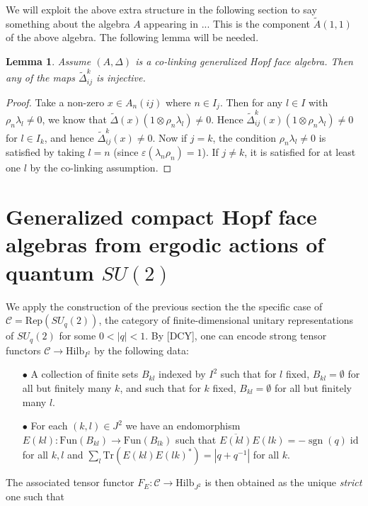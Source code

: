 \documentclass[12pt]{article}
\theoremstyle{change}
\DeclareMathOperator{\id}{id}
\DeclareMathOperator{\sgn}{\mathrm{sgn}}
\newcommand{\Tr}{\mathrm{Tr}}
\newcommand{\CatC}{\mathcal{C}}
\newcommand{\Hilb}{\mathrm{Hilb}}
\newcommand{\Fun}{\mathrm{Fun}}
\newcommand{\wDelta}{\widetilde{\Delta}}
\newcommand{\Rep}{\mathrm{Rep}}
\newtheorem{Lem}[Theorem]{Lemma}
\theoremstyle{definition}
\numberwithin{equation}{section}
\begin{document}
We will exploit the above extra structure in the following section to say something about the algebra $A$ appearing in ... This is the component $\tilde{A}(1,1)$ of the above algebra. The following lemma will be needed.

\begin{Lem} Assume $(A,\Delta)$ is a co-linking generalized Hopf face algebra. Then any of the maps $\wDelta_{ij}^k$ is injective.\end{Lem}

\begin{proof} Take a non-zero $x\in A_n(ij)$ where $n\in I_j$. Then for any $l\in I$ with $\rho_n\lambda_l\neq 0$, we know that $\wDelta(x)(1\otimes \rho_n\lambda_l)\neq 0$. Hence $\wDelta_{ij}^k(x)(1\otimes \rho_n\lambda_l)\neq 0$ for $l\in I_k$, and hence $\wDelta_{ij}^k(x)\neq 0$. Now if $j=k$, the condition $\rho_n\lambda_l\neq 0$ is satisfied by taking $l=n$ (since $\varepsilon(\lambda_n\rho_n)=1$). If $j\neq k$, it is satisfied for at least one $l$ by the co-linking assumption.
\end{proof}

\section*{Generalized compact Hopf face algebras from ergodic actions of quantum $SU(2)$}

We apply the construction of the previous section the the specific case of $\CatC = \Rep(SU_q(2))$, the category of finite-dimensional unitary representations of $SU_q(2)$ for some $0<|q|<1$. By [DCY], one can encode strong tensor functors $\CatC\rightarrow \Hilb_{I^2}$ by the following data:
\begin{itemize}
\item[$\bullet$] A collection of finite sets $B_{kl}$ indexed by $I^2$ such that for $l$ fixed, $B_{kl} = \emptyset$ for all but finitely many $k$, and such that for $k$ fixed, $B_{kl}=\emptyset$ for all but finitely many $l$.
\item[$\bullet$] For each $(k,l)\in J^2$ we have an endomorphism $E(kl): \Fun(B_{kl})\rightarrow \Fun(B_{lk})$ such that $\overline{E(kl)}E(lk) = -\sgn(q)\id$ for all $k,l$ and $\sum_l \Tr(E(kl)E(lk)^*) = |q+q^{-1}|$ for all $k$.
\end{itemize}

The associated tensor functor $F_E:\CatC\rightarrow \Hilb_{J^2}$ is then obtained as the unique \emph{strict} one such that
\end{document}
